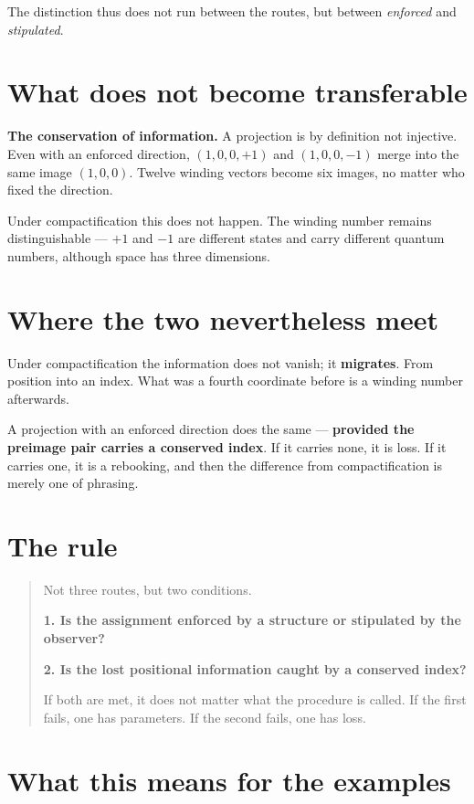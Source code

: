 The distinction thus does not run between the routes, but between
\emph{enforced} and \emph{stipulated}.

\section{What does not become transferable}

\textbf{The conservation of information.} A projection is by definition
not injective. Even with an enforced direction, $(1,0,0,+1)$ and
$(1,0,0,-1)$ merge into the same image $(1,0,0)$. Twelve winding
vectors become six images, no matter who fixed the direction.

Under compactification this does not happen. The winding number remains
distinguishable --- $+1$ and $-1$ are different states and carry
different quantum numbers, although space has three dimensions.

\section{Where the two nevertheless meet}

Under compactification the information does not vanish; it
\textbf{migrates}. From position into an index. What was a fourth
coordinate before is a winding number afterwards.

A projection with an enforced direction does the same --- \textbf{provided
the preimage pair carries a conserved index}. If it carries none, it is
loss. If it carries one, it is a rebooking, and then the difference
from compactification is merely one of phrasing.

\section{The rule}

\begin{quote}
Not three routes, but two conditions.

\textbf{1. Is the assignment enforced by a structure or stipulated by
the observer?}

\textbf{2. Is the lost positional information caught by a conserved
index?}

If both are met, it does not matter what the procedure is called. If
the first fails, one has parameters. If the second fails, one has loss.
\end{quote}

\section{What this means for the examples}

